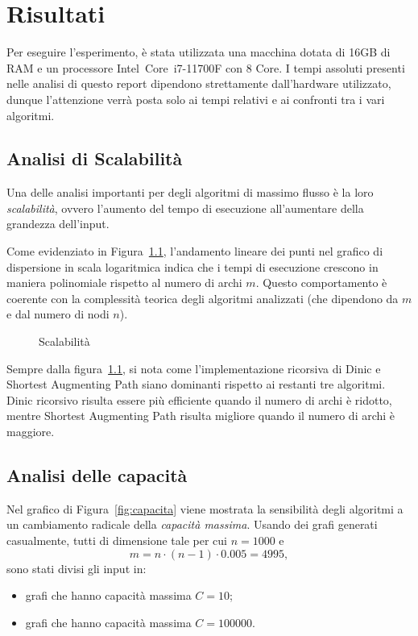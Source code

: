 \documentclass[11pt]{report}
\begin{document}
    \chapter{Risultati}\label{ch:risultati}
    Per eseguire l'esperimento, è stata utilizzata una macchina dotata di 16GB di RAM e un processore Intel\textregistered\ Core\texttrademark\ i7-11700F con 8 Core.
    I tempi assoluti presenti nelle analisi di questo report dipendono strettamente dall'hardware utilizzato, dunque l'attenzione verrà posta solo ai tempi relativi e ai confronti tra i vari algoritmi.

    \section{Analisi di Scalabilità}\label{sec:scalability}
    Una delle analisi importanti per degli algoritmi di massimo flusso è la loro \textit{scalabilità}, ovvero l'aumento del tempo di esecuzione all'aumentare della grandezza dell'input.

    Come evidenziato in Figura~\ref{fig:scal}, l'andamento lineare dei punti nel grafico di dispersione in scala logaritmica indica che i tempi di esecuzione crescono in maniera polinomiale rispetto al numero di archi $m$.
    Questo comportamento è coerente con la complessità teorica degli algoritmi analizzati (che dipendono da $m$ e dal numero di nodi $n$).

    \begin{figure}[ht]
        \centering
        \resizebox{0.9\textwidth}{!}{}
        \caption{Scalabilità}
        \label{fig:scal}
    \end{figure}

    Sempre dalla figura~\ref{fig:scal}, si nota come l'implementazione ricorsiva di Dinic e Shortest Augmenting Path siano dominanti rispetto ai restanti tre algoritmi.
    Dinic ricorsivo risulta essere più efficiente quando il numero di archi è ridotto, mentre Shortest Augmenting Path risulta migliore quando il numero di archi è maggiore.

    \section{Analisi delle capacità}\label{sec:analisi_capacita}
    Nel grafico di Figura~\ref{fig:capacita} viene mostrata la sensibilità degli algoritmi a un cambiamento radicale della \textit{capacità massima}.
    Usando dei grafi generati casualmente, tutti di dimensione tale per cui $n=1000$ e $$m=n\cdot (n-1)\cdot 0.005 = 4995,$$ sono stati divisi gli input in:
    \begin{itemize}
        \item grafi che hanno capacità massima $C=10$;
        \item grafi che hanno capacità massima $C=100000$.
    \end{itemize}
\end{document}
